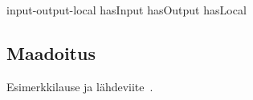 \documentclass[finnish]{tktltiki2}
\theoremstyle{definition}
\theoremstyle{remark}
\begin{document}
input-output-local
hasInput hasOutput hasLocal
 

\subsection{Maadoitus}

Esimerkkilause ja lähdeviite~\cite{pitfalls}.


%
%
% 
%



\end{document}
